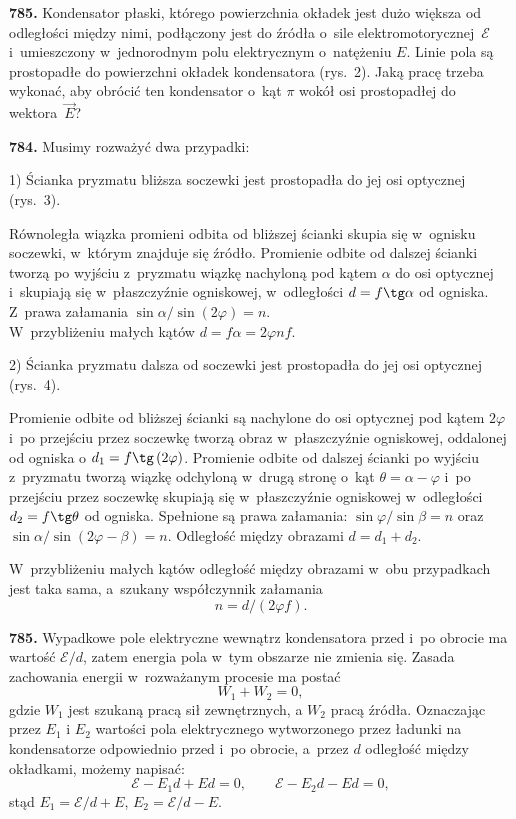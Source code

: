 {{{{\bf 785.} Kondensator płaski, którego powierzchnia okładek jest dużo większa od odległości między nimi, podłączony jest do źródła o~sile elektromotorycznej~$\mathcal E $ i~umieszczony w~jednorodnym polu elektrycznym o~natężeniu $E$. Linie pola są prostopadłe do powierzchni okładek  kondensatora (rys.~2). Jaką pracę trzeba wykonać, aby obrócić ten kondensator o~kąt $\pi $  wokół osi prostopadłej do wektora~$\vec{E}$?

}}


\textbf{784.}
Musimy rozważyć dwa przypadki:

1) Ścianka pryzmatu bliższa soczewki jest prostopadła do jej osi optycznej (rys.~3).

     Równoległa wiązka promieni odbita od bliższej ścianki skupia się w~ognisku soczewki, w~którym znajduje się źródło. Promienie odbite od dalszej ścianki tworzą po wyjściu z~pryzmatu wiązkę nachyloną pod kątem $\alpha $ do osi optycznej i~skupiają się w~płaszczyźnie ogniskowej, w~odległości $d=f\tg\alpha $ od ogniska. Z~prawa załamania ${\sin\alpha }/{\sin\left(2\varphi \right)}=n$.
\\
     W~przybliżeniu małych kątów $d=f\alpha =2\varphi nf$. 

2) Ścianka pryzmatu dalsza od soczewki jest prostopadła do jej osi optycznej (rys.~4).

\vspace*{\parskip}
\begin{dwieszpalty}     Promienie odbite od bliższej ścianki są nachylone do osi optycznej pod kątem  $2\varphi $ i~po przejściu przez soczewkę tworzą obraz w~płaszczyźnie ogniskowej, oddalonej od ogniska o $d_1=f\tg\left(2\varphi \right)$. Promienie odbite od dalszej ścianki po wyjściu z~pryzmatu tworzą wiązkę odchyloną w~drugą stronę o~kąt $\theta =\alpha -\varphi $ i~po przejściu przez soczewkę skupiają się w~płaszczyźnie ogniskowej w~odległości $d_2=f\tg\theta $ od ogniska. Spełnione są prawa załamania: ${\sin\varphi }/{\sin\beta }=n$ oraz   ${\sin \alpha}/{\sin\left(2\varphi -\beta \right)}=n$. Odległość między obrazami $d=d_1+d_2$.

W~przybliżeniu małych kątów odległość między obrazami w~obu przypadkach jest taka sama, a~szukany współczynnik załamania 
\[n={d}/{\left(2\varphi f\right)}.\] 


\textbf{785.}
Wypadkowe pole elektryczne wewnątrz kondensatora przed i~po obrocie ma wartość ${\mathcal E }/{d}$, zatem energia pola w~tym obszarze nie zmienia się. Zasada zachowania energii w~rozważanym procesie ma postać
\begin{equation*} %
W_1+W_2=0, 
\end{equation*} 
gdzie $W_1$ jest szukaną pracą sił zewnętrznych, a $W_2$ pracą źródła. Oznaczając przez $E_1$ i $E_2$ wartości pola elektrycznego wytworzonego przez ładunki na kondensatorze odpowiednio przed i~po obrocie, a~przez $d$ odległość między okładkami, możemy napisać:
\[\mathcal E -E_1d+Ed=0,\qquad  \mathcal E -E_2d-Ed=0,\] 
stąd                                         $E_1={\mathcal E }/{d}+E$,                   $E_2={\mathcal E }/{d}-E$.


\end{dwieszpalty}}
